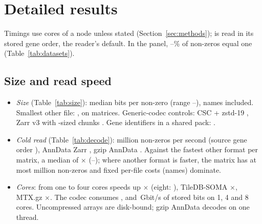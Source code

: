 \section{Detailed results}
\label{sec:sresults}

Timings use  cores of a  node unless stated (Section~\ref{sec:methods}); \sone{} is read in
its stored gene order, the reader's default. In the panel, --\% of non-zeros
equal one (Table~\ref{tab:datasets}).

\subsection{Size and read speed}
\begin{itemize}\itemsep 1pt
\item \emph{Size} (Table~\ref{tab:size}): \sone{} median  bits per non-zero (range
  --), names included. Smallest other file: , on
   matrices. Generic-codec controls: CSC + zstd-19 , Zarr v3 with
  \sone-sized chunks . Gene identifiers in a shared pack: .
\item \emph{Cold read} (Table~\ref{tab:decode}): \sone{}  million non-zeros per second (source
  gene order ), AnnData Zarr , gzip AnnData
  . Against the fastest other format per matrix, a median of $\times$
  (--); where another format is faster, the matrix has at most
   million non-zeros and fixed per-file costs (names) dominate.
\item \emph{Cores}: from one to four cores \sone{} speeds up $\times$ (eight: ),
  TileDB-SOMA $\times$, MTX.gz $\times$. The codec consumes
  ,  and \,Gbit/s of stored bits on 1, 4
  and 8 cores. Uncompressed arrays are disk-bound; gzip AnnData decodes on one thread.
\end{itemize}

